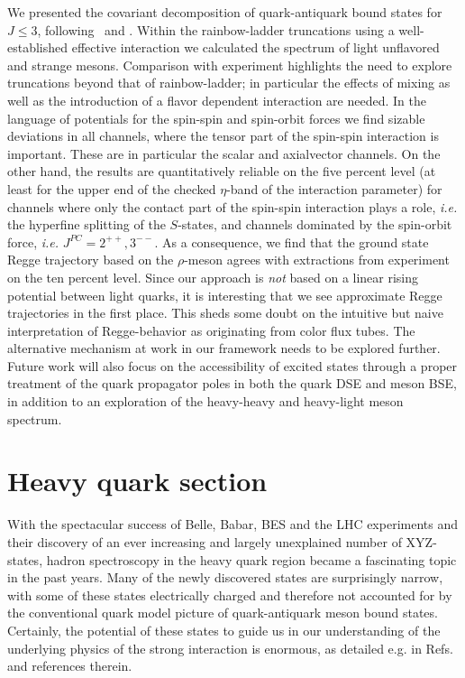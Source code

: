 %
We presented the covariant decomposition of quark-antiquark bound states for $J\le3$, 
following~\cite{Joos:1962qq,Weinberg:1964cn} and \cite{Zemach:1968zz}. Within the 
rainbow-ladder truncations using a well-established effective interaction we calculated 
the spectrum of light unflavored and strange mesons. Comparison with experiment highlights 
the need to explore truncations beyond that of rainbow-ladder; in particular the effects 
of mixing as well as the introduction of a flavor dependent interaction are needed.
In the language of potentials for the spin-spin and spin-orbit forces we find 
sizable deviations in all channels, where the tensor part of the spin-spin interaction is important.
These are in particular the scalar and axialvector channels. On the other hand, the results
are quantitatively reliable on the five percent level (at least for the upper end of the 
checked $\eta$-band of the interaction parameter) for channels where only the contact part
of the spin-spin interaction plays a role, {\it i.e.} the hyperfine splitting of the
$S$-states, and channels dominated by the spin-orbit force, {\it i.e.} $J^{PC}= 2^{++}, 3^{--}$.
As a consequence, we find that the ground state Regge trajectory based on the $\rho$-meson
agrees with extractions from experiment on the ten percent level. Since our approach is
{\it not} based on a linear rising potential between light quarks, it is interesting that 
we see approximate Regge trajectories in the first place. This sheds some doubt on the
intuitive but naive interpretation of Regge-behavior as originating from color flux tubes.
The alternative mechanism at work in our framework needs to be explored further. 
Future work will also focus on the accessibility of excited states through a proper
treatment of the quark propagator poles in both the quark DSE and meson BSE, in 
addition to an exploration of the heavy-heavy and heavy-light meson spectrum.

\section{Heavy quark section}
With the spectacular success of Belle, Babar, BES and the LHC 
experiments and their discovery of an ever increasing and
largely unexplained number of XYZ-states, hadron spectroscopy 
in the heavy quark region became a fascinating topic in the 
past years. Many of the newly discovered states are surprisingly 
narrow, with some of these states electrically charged and
therefore not accounted for by the conventional quark model picture 
of quark-antiquark meson bound states.
Certainly, the potential of these states to guide us in our
understanding of the underlying physics of the strong interaction
is enormous, as detailed e.g. in Refs.~\cite{Brambilla:2010cs,
Pakhlova:2010zza,JohanMesschendorpfortheBESIII:2013vla,Bodwin:2013nua} 
and references therein.

